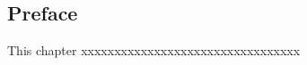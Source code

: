 \begin{frontchapter}

\begin{frontmatter}
\chapter*{Preface}
\makechaptertitle
\end{frontmatter}



This chapter xxxxxxxxxxxxxxxxxxxxxxxxxxxxxxxxx




\end{frontchapter}





